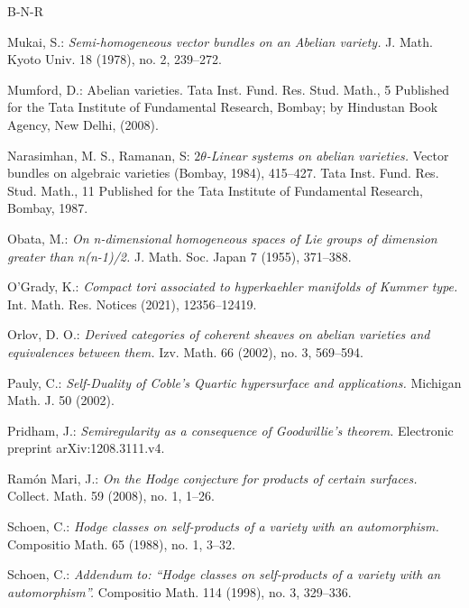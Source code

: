\documentclass[12pt]{amsart}
\numberwithin{equation}{subsection}
\theoremstyle{plain}
\theoremstyle{definition}
\begin{document}
\begin{thebibliography}{B-N-R}

 Mukai, S.: 
{\em  Semi-homogeneous vector bundles on an Abelian variety.\/}
J. Math. Kyoto Univ. 18 (1978), no. 2, 239--272.

 Mumford, D.: {Abelian varieties.\/} Tata Inst. Fund. Res. Stud. Math., 5 
Published for the Tata Institute of Fundamental Research, Bombay; by Hindustan Book Agency, New Delhi, (2008).

 Narasimhan, M. S., Ramanan, S: {\em $2\theta$-Linear systems on abelian varieties.\/} Vector bundles on algebraic varieties (Bombay, 1984), 415--427.
Tata Inst. Fund. Res. Stud. Math., 11
Published for the Tata Institute of Fundamental Research, Bombay, 1987.

 Obata, M.: {\em On n-dimensional homogeneous spaces of Lie groups of dimension greater than n(n-1)/2.\/}
 J. Math. Soc. Japan 7 (1955), 371--388.
 
 
  O'Grady, K.: 
{\em Compact tori associated to hyperkaehler manifolds of Kummer type.\/}
Int. Math. Res. Notices (2021), 12356--12419.

 Orlov, D. O.: 
{\em 
Derived categories of coherent sheaves on abelian varieties and equivalences between them.\/} Izv. Math. 66 (2002), no. 3, 569--594. 

 Pauly, C.: {\em Self-Duality of Coble's Quartic hypersurface and applications.\/}
Michigan Math. J. 50 (2002).

 Pridham, J.: {\em Semiregularity as a consequence of Goodwillie's theorem.\/} Electronic preprint arXiv:1208.3111.v4.

 Ram\'{o}n Mari, J.: 
{\em On the Hodge conjecture for products of certain surfaces.\/} Collect. Math. 59 (2008), no. 1, 1--26. 

Schoen, C.: {\em Hodge classes on self-products of a variety with an
 automorphism.\/}  Compositio Math. 65 (1988), no. 1, 3--32. 

Schoen, C.: {\em Addendum to: ``Hodge classes on self-products of a variety with an
 automorphism''.\/} Compositio Math. 114 (1998), no. 3, 329--336.



\end{thebibliography}
\end{document}
